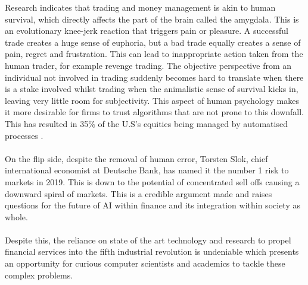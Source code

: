 \documentclass[ %
                    author={Ashwinder Khurana},
                supervisor={Prof Dave Cliff},
                    degree={MEng},
                     title={The Deeply Reinforced Trader},
                  subtitle={},
                      type={enterprise},
                      year={2020} ]{dissertation}
\begin{document}
Research indicates\cite{quora-trading-hard} that trading and money management is akin to human survival, which directly affects the part of the brain called the amygdala. This is an evolutionary knee-jerk reaction that triggers pain or pleasure. A successful trade creates a huge sense of euphoria, but a bad trade equally creates a sense of pain, regret and frustration. This can lead to inappropriate action taken from the human trader, for example revenge trading. The objective perspective from an individual not involved in trading suddenly becomes hard to translate when there is a stake involved whilst trading when the animalistic sense of survival kicks in, leaving very little room for subjectivity. This aspect of human psychology makes it more desirable for firms to trust algorithms that are not prone to this downfall. This has resulted in 35\% of the U.S's equities being managed by automatised processes \cite{https://www.statista.com/chart/20245/share-of-computerized-and-human-trading-in-us-equities/}. 
\\
\\
On the flip side, despite the removal of human error, Torsten Slok, chief international economist at Deutsche Bank, has named it the number 1 risk to markets in 2019\cite{https://www.statista.com/chart/20245/share-of-computerized-and-human-trading-in-us-equities/}. This is down to the potential of concentrated sell offs causing a downward spiral of markets. This is a credible argument made and raises questions for the future of AI within finance and its integration within society as whole.
\\
\\
Despite this, the reliance on state of the art technology and research to propel financial services into the fifth industrial revolution is undeniable which presents an opportunity for curious computer scientists and academics to tackle these complex problems. 

\vspace{0.5cm}
\end{document}
